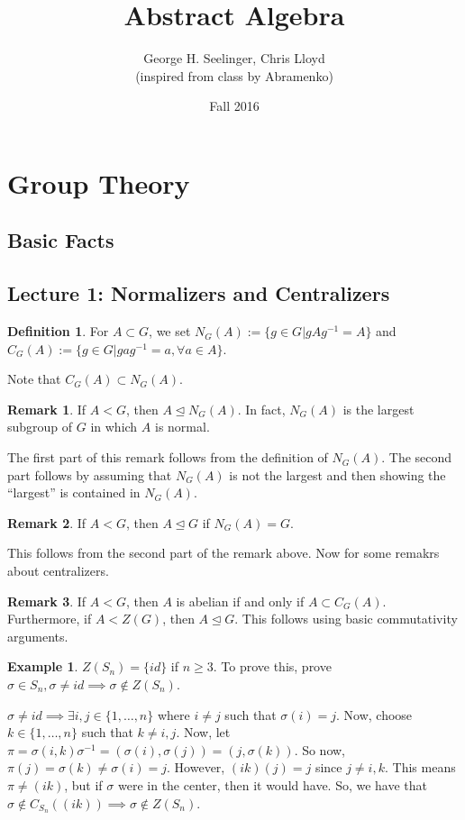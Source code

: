 \documentclass[11pt,leqno,oneside]{amsart}
\title[Abstract Algebra]{Abstract Algebra}
\author{George H. Seelinger, Chris Lloyd\\ (inspired from class by Abramenko)}
\date{Fall 2016}
\newcommand{\subgroup}{\mathrel{<}}
\newcommand{\normsubgroup}{\mathrel{\unlhd}}
\theoremstyle{definition}
\newtheorem{defn}[thm]{Definition}
\newtheorem{example}[thm]{Example}
\newtheorem*{rmk*}{Remark}
\numberwithin{equation}{section}
\begin{document}
\maketitle
\section{Group Theory}
\subsection{Basic Facts}
\subsection*{Lecture 1: Normalizers and Centralizers}
\begin{defn}
    For $A \subset G$, we set $N_G(A) := \{g \in G | gAg^{-1} = A\}$ and
    $C_G(A) := \{g \in G | gag^{-1} = a, \forall a \in A\}$.
\end{defn}
Note that $C_G(A) \subset N_G(A)$.
\begin{rmk*}
    If $A \subgroup G$, then $A \normsubgroup N_G(A)$. In fact, $N_G(A)$ is the
    largest subgroup of $G$ in which $A$ is normal.
\end{rmk*}
    The first part of this remark follows from the definition of $N_G(A)$. The
    second part follows by assuming that $N_G(A)$ is not the largest and then
    showing the ``largest'' is contained in $N_G(A)$.
\begin{rmk*}
    If $A \subgroup G$, then $A \normsubgroup G$ if $N_G(A) = G$.
\end{rmk*}
    This follows from the second part of the remark above.
    Now for some remakrs about centralizers.
    \begin{rmk*}
        If $A \subgroup G$, then $A$ is abelian if and only if $A \subset
        C_G(A)$. Furthermore, if $A \subgroup Z(G)$, then $A \normsubgroup G$.
        This follows using basic commutativity arguments.
    \end{rmk*}
    \begin{example}
        $Z(S_n) = \{ id \}$ if $n \geq 3$. To prove this, prove $\sigma \in S_n, \sigma \neq id \implies \sigma \notin Z(S_n)$.

        $\sigma \neq id \implies \exists i,j \in \{1, \ldots, n\}$ where $i
        \neq j$ such that $\sigma(i) = j$. Now, choose $k \in \{1, \ldots, n\}$
        such that $k \neq i,j$. Now, let $\pi = \sigma(i,k)\sigma^{-1} =
        (\sigma(i), \sigma(j)) = (j, \sigma(k))$. So now, $\pi(j) = \sigma(k)
        \neq \sigma(i) = j$. However, $(ik)(j)=j$ since $j \neq i,k$. This
        means $\pi \neq (ik)$, but if $\sigma$ were in the center, then it
        would have. So, we have that $\sigma \notin C_{S_n}( (ik) ) \implies
        \sigma \notin Z(S_n)$.
    \end{example}
\end{document}
